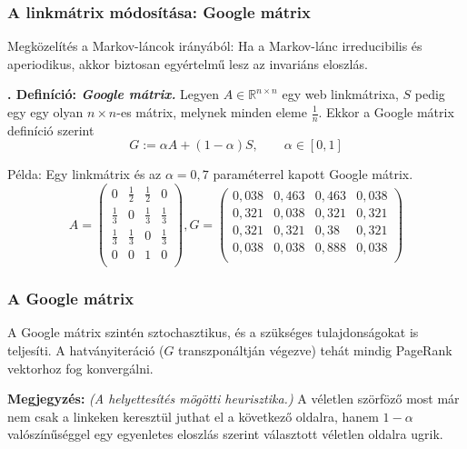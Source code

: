 \documentclass[]{beamer}
\newcounter{definicioszam}
\newenvironment{definicio}[1]
{{\medskip}\noindent \stepcounter{definicioszam}
{\bfseries{\thedefinicioszam. Definíció: \textit{#1.}}}}{\bigskip }
\begin{document}
\begin{frame}
	\frametitle{A linkmátrix módosítása: Google mátrix}
	
	Megközelítés a Markov-láncok irányából: Ha a Markov-lánc irreducibilis és aperiodikus, akkor biztosan egyértelmű lesz az invariáns eloszlás.
	
	\begin{definicio}{Google mátrix}
		Legyen $A \in \mathbb{R}^{n \times n}$ egy web linkmátrixa, $S$ pedig egy egy olyan $n \times n$-es mátrix, melynek minden eleme $\frac{1}{n}$. Ekkor a Google mátrix definíció szerint
		\[ G := \alpha A + (1-\alpha) S, \qquad \alpha \in [0,1] \]
	\end{definicio}

\vspace{-0.8cm}
Példa: Egy linkmátrix és az $\alpha = 0,7$ paraméterrel kapott Google mátrix.
\[A =
\begin{pmatrix}
0 & \frac{1}{2} & \frac{1}{2} & 0 \\
\frac{1}{3} & 0 & \frac{1}{3} & \frac{1}{3} \\
\frac{1}{3} & \frac{1}{3} & 0 & \frac{1}{3} \\
0 & 0 & 1 & 0 \\
\end{pmatrix},
G = 
\begin{pmatrix}
0,\!038 & 0,\!463 & 0,\!463 & 0,\!038 \\
0,\!321 & 0,\!038 & 0,\!321 & 0,\!321 \\
0,\!321 & 0,\!321 & 0,\!38 & 0,\!321 \\
0,\!038 & 0,\!038 & 0,\!888 & 0,\!038 \\
\end{pmatrix}
\]
\end{frame}

\begin{frame}
	\frametitle{A Google mátrix}
	
	A Google mátrix szintén sztochasztikus, és a szükséges tulajdonságokat is teljesíti. A hatványiteráció ($G$ transzponáltján végezve) tehát mindig PageRank vektorhoz fog konvergálni.
	
	\bigskip
	
	\textbf{Megjegyzés:} \textit{(A helyettesítés mögötti heurisztika.)} \newline
	A véletlen szörföző most már nem csak a linkeken keresztül juthat el a következő oldalra, hanem $1-\alpha$ valószínűséggel egy egyenletes eloszlás szerint választott véletlen oldalra ugrik.
\end{frame}
\end{document}
